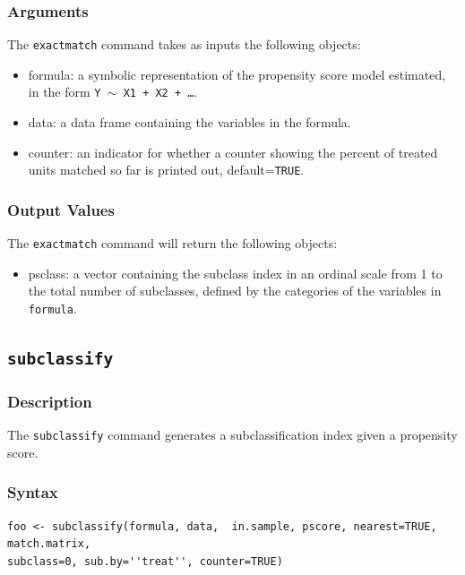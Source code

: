 \documentclass[oneside,letterpaper,titlepage]{article}
\begin{document}
\begin{appendix}
\subsubsection{Arguments}
The \texttt{exactmatch} command takes as inputs the following
objects:
\begin{itemize}
\item{formula}: a symbolic representation of the propensity score
  model estimated, in the form {\tt Y $\sim$ X1 + X2 + \dots}.
\item{data}: a data frame containing the variables in the formula.
\item{counter}: an indicator for whether a counter showing the percent
  of treated units matched so far is printed out, default={\tt TRUE}.
\end{itemize}

\subsubsection{Output Values}
The \texttt{exactmatch} command will return the following objects: 
\begin{itemize}
\item{psclass}: a vector containing the subclass index in an ordinal
  scale from 1 to the total number of subclasses, defined by the
  categories of the variables in {\tt formula}.
\end{itemize}

\subsection{\texttt{subclassify}}

\subsubsection{Description}
The \texttt{subclassify} command generates a subclassification index
given a propensity score. 

\subsubsection{Syntax}
\begin{verbatim}
foo <- subclassify(formula, data,  in.sample, pscore, nearest=TRUE, match.matrix,
subclass=0, sub.by=''treat'', counter=TRUE)
\end{verbatim} 


\end{appendix}
\end{document}
